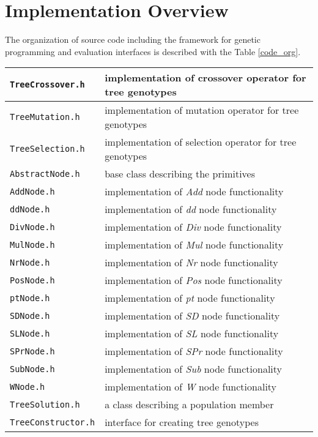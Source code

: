 \chapter{Implementation Overview}
\label{implementation}
The organization of source code including the framework for genetic programming and evaluation interfaces is described with the Table \ref{code_org}.
\begin{longtable}{| p{} | p{} |}
\hline
\texttt{TreeCrossover.h}    & implementation of crossover operator for tree genotypes \\ \hline
\texttt{TreeMutation.h}  & implementation of mutation operator for tree genotypes \\ \hline
\texttt{TreeSelection.h} & implementation of selection operator for tree genotypes  \\ \hline
\texttt{AbstractNode.h} & base class describing the primitives \\ \hline
\texttt{AddNode.h} & implementation of \textit{Add} node functionality \\ \hline
\texttt{ddNode.h} & implementation of \textit{dd} node functionality \\ \hline
\texttt{DivNode.h} & implementation of \textit{Div} node functionality \\ \hline
\texttt{MulNode.h} & implementation of \textit{Mul} node functionality \\ \hline
\texttt{NrNode.h} & implementation of \textit{Nr} node functionality  \\\hline
\texttt{PosNode.h} & implementation of \textit{Pos} node functionality \\ \hline
\texttt{ptNode.h} & implementation of \textit{pt} node functionality \\ \hline
\texttt{SDNode.h} & implementation of \textit{SD} node functionality \\ \hline
\texttt{SLNode.h} & implementation of \textit{SL} node functionality \\ \hline
\texttt{SPrNode.h} & implementation of \textit{SPr} node functionality \\ \hline
\texttt{SubNode.h} & implementation of \textit{Sub} node functionality \\ \hline
\texttt{WNode.h} & implementation of \textit{W} node functionality \\ \hline
\texttt{TreeSolution.h} & a class describing a population member \\ \hline
\texttt{TreeConstructor.h} & interface for creating tree genotypes \\ \hline

\end{longtable}
